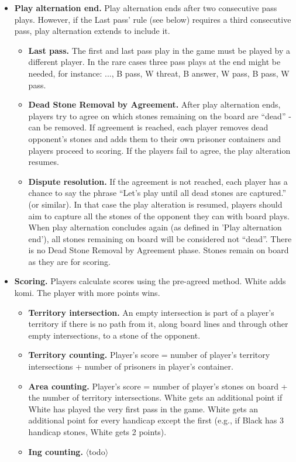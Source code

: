 \documentclass[11pt]{article}
\begin{document}
\begin{itemize}
\item \textbf{Play alternation end.} Play alternation ends after two consecutive pass plays. However, if the Last pass' rule (see below) requires a third consecutive pass, play alternation extends to include it.
    \begin{itemize}
    \item \textbf{Last pass.} The first and last pass play in the game must be played by a different player. In the rare cases three pass plays at the end might be needed, for instance: ..., B pass, W threat, B answer, W pass, B pass, W pass.
    \item \textbf{Dead Stone Removal by Agreement.} After play alternation ends, players try to agree on which stones remaining on the board are ``dead'' - can be removed. If agreement is reached, each player removes dead opponent's stones and adds them to their own prisoner containers and players proceed to scoring. If the players fail to agree, the play alteration resumes.
    \item \textbf{Dispute resolution.} If the agreement is not reached, each player has a chance to say the phrase ``Let's play until all dead stones are captured.'' (or similar). In that case the play alteration is resumed, players should aim to capture all the stones of the opponent they can with board plays. When play alternation concludes again (as defined in 'Play alternation end'), all stones remaining on board will be considered not ``dead''. There is no Dead Stone Removal by Agreement phase. Stones remain on board as they are for scoring.
    \end{itemize}

\item \textbf{Scoring.} Players calculate scores using the pre-agreed method. White adds komi. The player with more points wins.
    \begin{itemize}
    \item \textbf{Territory intersection.} An empty intersection is part of a player's territory if there is no path from it, along board lines and through other empty intersections, to a stone of the opponent.
    \item \textbf{Territory counting.} Player's score = number of player's territory intersections + number of prisoners in player's container.
    \item \textbf{Area counting.} Player's score = number of player's stones on board + the number of territory intersections. White gets an additional point if White has played the very first pass in the game. White gets an additional point for every handicap except the first (e.g., if Black has 3 handicap stones, White gets 2 points).
    \item \textbf{Ing counting.} $\langle$todo$\rangle$
    \end{itemize}
\end{itemize}
\end{document}
